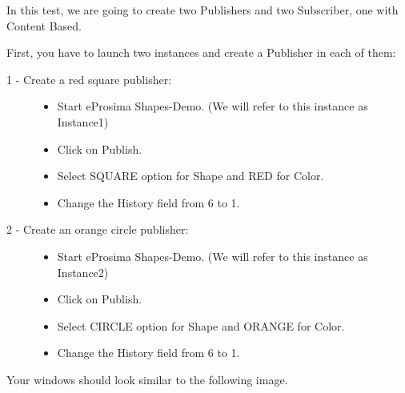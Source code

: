 \documentclass[letterpaper,10pt,english]{sphinxmanual}
\begin{document}
In this test, we are going to create two Publishers and two Subscriber, one with Content Based.


First, you have to launch two instances and create a Publisher in each of them:
\begin{description}
\item[{1 - Create a red square publisher:}] \leavevmode\begin{itemize}
\item {} 
Start eProsima Shapes-Demo. (We will refer to this instance as Instance1)

\item {} 
Click on Publish.

\item {} 
Select SQUARE option for Shape and RED for Color.

\item {} 
Change the History field from 6 to 1.

\end{itemize}

\item[{2 - Create an orange circle publisher:}] \leavevmode\begin{itemize}
\item {} 
Start eProsima Shapes-Demo. (We will refer to this instance as Instance2)

\item {} 
Click on Publish.

\item {} 
Select CIRCLE option for Shape and ORANGE for Color.

\item {} 
Change the History field from 6 to 1.

\end{itemize}

\end{description}

Your windows should look similar to the following image.

\end{document}
